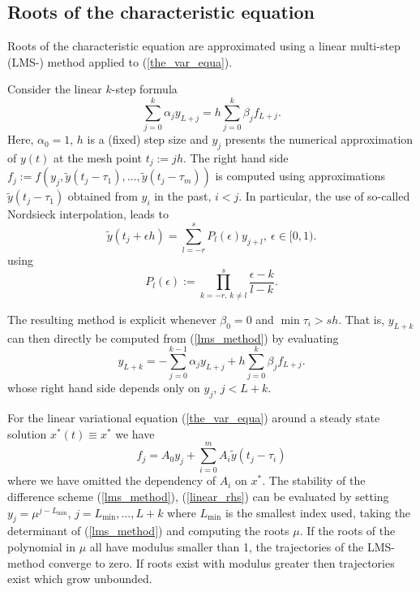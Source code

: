 \documentclass[10pt]{article}
\gdef \defeq{:=}
\begin{document}
{\subsection{Roots of the characteristic equation}\label{root_char_equa_gio_label}

Roots of the characteristic equation are
approximated using a linear multi-step (LMS-) method
applied to (\ref{the_var_equa}).

Consider the linear $k$-step formula
\begin{equation}\label{lms_method}
\sum_{j=0}^k\alpha_j y_{L+j}=h\sum_{j=0}^k\beta_j f_{L+j}.
\end{equation}
Here, $\alpha_0=1$, $h$ is a (fixed) step size and 
$y_j$ presents the numerical approximation of $y(t)$ at the mesh
point $t_j\defeq jh$.
The right hand side
$f_j\defeq f(y_j,\tilde{y}(t_j-\tau_1),\ldots,\tilde{y}(t_j-\tau_m))$ 
is computed using approximations $\tilde{y}(t_j-\tau_1)$ 
obtained from $y_i$ in the past, $i<j$.
In particular, the use of so-called Nordsieck interpolation, leads to
\begin{equation}\label{past_terms}
\tilde{y}(t_j+\epsilon h)=\sum_{l=-r}^s P_l(\epsilon)y_{j+l},\ \epsilon \in [0,1).
\end{equation}
using
\[
P_l(\epsilon)\defeq\prod_{k=-r,\,k\neq l}^s\frac{\epsilon-k}{l-k}.
\]

The resulting method is explicit whenever $\beta_0=0$ and 
$\min{\tau_i}>sh$.
That is, $y_{L+k}$ can then directly be computed from (\ref{lms_method})
by evaluating
\[
y_{L+k}=-\sum_{j=0}^{k-1}\alpha_j y_{L+j}+h\sum_{j=0}^k\beta_j f_{L+j}.
\]
whose right hand side depends only on $y_j$, $j<L+k$.

For the linear variational equation (\ref{the_var_equa})
around a steady state solution $x^*(t)\equiv x^*$
we have
\begin{equation}\label{linear_rhs}
f_j=A_0y_j+\sum_{i=0}^mA_i\tilde{y}(t_j-\tau_i)
\end{equation}
where we have omitted the dependency of $A_i$ on $x^*$.
The stability of the difference scheme (\ref{lms_method}), (\ref{linear_rhs})
can be evaluated by setting $y_j=\mu^{j-L_{\min}}$, $j=L_{\min},\ldots,L+k$ 
where $L_{\min}$ is the 
smallest index used, taking the determinant of (\ref{lms_method})
and computing the roots $\mu$. If the roots of the
polynomial in $\mu$ all have modulus smaller than 1, the trajectories
of the LMS-method converge to zero. 
If roots exist with modulus greater then trajectories exist
which grow unbounded.

}
\end{document}
